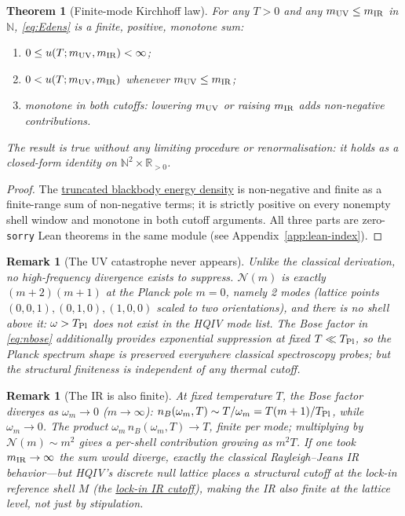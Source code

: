 \documentclass[11pt]{amsart}
\newtheorem{theorem}[definition]{Theorem}
\newtheorem{remark}[definition]{Remark}
\begin{document}
\begin{theorem}[Finite-mode Kirchhoff law]\label{thm:kirchhoff}
For any $T>0$ and any $m_{\rm UV}\le m_{\rm IR}$ in $\mathbb{N}$,
\eqref{eq:Edens} is a finite, positive, monotone sum:
\begin{enumerate}[leftmargin=2em]
\item $0\le u(T;m_{\rm UV},m_{\rm IR})<\infty$;
\item $0<u(T;m_{\rm UV},m_{\rm IR})$ whenever $m_{\rm UV}\le m_{\rm IR}$;
\item monotone in both cutoffs: lowering $m_{\rm UV}$ or raising
  $m_{\rm IR}$ adds non-negative contributions.
\end{enumerate}
The result is true without any limiting procedure or
renormalisation: it holds as a closed-form identity on
$\mathbb{N}^{2}\times\mathbb{R}_{>0}$.
\end{theorem}
\begin{proof}
The
\hyperref[lean:blackbody-density]{truncated blackbody energy
density} is non-negative and finite as a finite-range sum of
non-negative terms; it is strictly positive on every nonempty
shell window and monotone in both cutoff arguments. All three
parts are zero-\texttt{sorry} Lean theorems in the same module
(see Appendix~\ref{app:lean-index}).
\end{proof}

\begin{remark}[The UV catastrophe never appears]\label{rmk:nouv}
Unlike the classical derivation, no high-frequency divergence
exists to suppress.  $\mathcal{N}(m)$ is exactly $(m+2)(m+1)$ at
the Planck pole $m=0$, namely 2 modes (lattice points
$(0,0,1),(0,1,0),(1,0,0)$ scaled to two orientations), and there
is no shell above it: $\omega>T_{\rm Pl}$ does not exist in the
HQIV mode list.  The Bose factor in \eqref{eq:nbose} additionally
provides exponential suppression at fixed $T\ll T_{\rm Pl}$, so
the Planck spectrum shape is preserved everywhere classical
spectroscopy probes; but the structural finiteness is independent
of any thermal cutoff.
\end{remark}

\begin{remark}[The IR is also finite]\label{rmk:noir}
At fixed temperature $T$, the Bose factor diverges as
$\omega_m\to 0$ ($m\to\infty$): $n_B(\omega_m,T)\sim T/\omega_m=
T(m+1)/T_{\rm Pl}$, while $\omega_m\to 0$.  The product
$\omega_m\,n_B(\omega_m,T)\to T$, finite per mode; multiplying by
$\mathcal{N}(m)\sim m^{2}$ gives a per-shell contribution growing
as $m^{2}T$.  If one took $m_{\rm IR}\to\infty$ the sum would
diverge, exactly the classical Rayleigh--Jeans IR behavior---but
HQIV's discrete null lattice places a structural cutoff at the
lock-in reference shell $M$ (the
\hyperref[lean:ir-cutoff]{lock-in IR cutoff}), making \emph{the
IR also finite at the lattice level}, not just by stipulation.
\end{remark}
\end{document}
